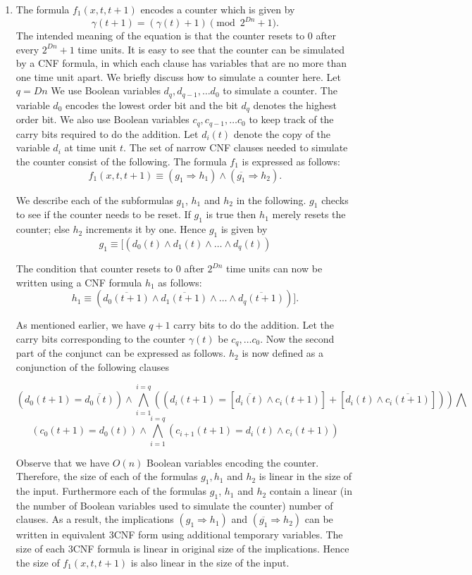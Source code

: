 \begin{enumerate}
\item 
The formula $f_1(x, t, t+1)$ encodes a counter which is given by 
\[\gamma(t + 1) =  (\gamma(t) + 1) \pmod{2^{Dn} +1}.\]
The intended meaning of the equation is  
that the counter resets to 0 after every $2^{Dn} +1$ time units.
It is easy to see that the counter 
can be simulated by a {\sf CNF} formula, in which each clause
has variables  that are no more than one time unit apart.
We briefly discuss how to simulate a counter here.  Let $q = Dn$
We use Boolean
variables $d_q, d_{q-1}, \ldots d_0$ to simulate a counter.
The variable $d_0$ encodes the lowest order bit and the bit $d_q$ denotes the
highest order bit. We also use  Boolean
variables $c_q, c_{q-1}, \ldots c_0$ to keep track of the carry bits 
required to do the addition. Let $d_i(t)$ denote
the copy of the variable $d_i$ at time unit $t$.
The set of narrow {\sf CNF} 
clauses needed to simulate the  counter  consist of the following.
The formula $f_1$ is expressed as follows:
\[f_1(x,t, t+1) \equiv (g_1 \Rightarrow h_1) \wedge (\overline{g_1} \Rightarrow h_2).\]

We describe each of the subformulas $g_1$, $h_1$ and $h_2$ in the 
following.
$g_1$ checks to see if the counter needs to be reset. If $g_1$ is true then
$h_1$ merely resets the counter; else $h_2$ increments it by one.
Hence $g_1$ is given by 
\[g_1  \equiv [(d_0(t) \wedge d_1(t) \wedge \ldots \wedge d_q(t) )\] 

The condition that counter resets to 0 after $2^{Dn}$ time units can now
be written using a CNF  formula $h_1$ as follows:
\[ h_1 \equiv (\overline{d_0(t+1)} \wedge \overline{d_1(t+1)} \wedge  
\ldots \wedge \overline{d_q(t+1)})].\]

As mentioned  earlier,
we have $q+1$ carry bits to do the addition. Let the carry bits
corresponding to the counter $\gamma(t)$ be $c_q, \ldots c_0$. Now the second 
part of the conjunct can be expressed as follows. $h_2$ is now defined
as a conjunction of the following clauses

\[\left(d_0(t+1) = \overline{d_0(t)} \right) \wedge
\bigwedge_{i= 1 }^{i = q} 
\left((d_i(t+1) = [\overline{d_i(t)} \wedge c_i(t+1)]+
               [d_i(t) \wedge \overline{c_i(t+1)}]) \right)\bigwedge \]
\[\left( c_0(t+1) = d_0(t) \right) \wedge  \bigwedge_{i =1}^{ i = q}  
\left(c_{i+1}(t+1) = d_i(t) \wedge c_i(t+1) \right) \]

Observe that we have $O(n)$ Boolean variables encoding the counter.
Therefore, the size of each of the formulas $g_1, h_1$ and $h_2$ is linear
in the size of the input.
Furthermore each of the formulas $g_1$, $h_1$ and $h_2$ contain a linear
(in the number of Boolean variables used to simulate the counter)  number
of clauses.  As a result, the implications 
$ (g_1 \Rightarrow h_1)$ and $(\overline{g_1} \Rightarrow h_2)$ can be written
in equivalent {\sf 3CNF} form using additional temporary variables.
The size of each {\sf 3CNF} formula is linear in original size of
the implications. 
Hence the size of $f_1(x,t,t+1)$ is also linear
in the size of the input. 



\end{enumerate}
